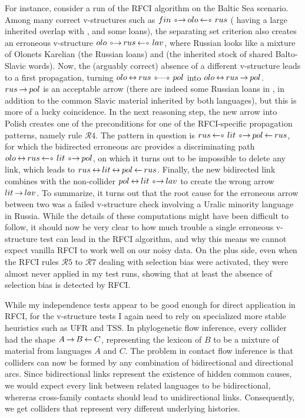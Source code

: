 For instance, consider a run of the RFCI algorithm on the Baltic Sea scenario. Among many correct v-structures such as $fin \arrowOA olo \arrowAO rus$ ( having a large inherited overlap with , and some  loans), the separating set criterion also creates an erroneous v-structure $olo \arrowOA rus \arrowAO lav$, where Russian looks like a mixture of Olonets Karelian (the Russian loans) and  (the inherited stock of shared Balto-Slavic words). Now, the (arguably correct) absence of a different v-structure leads to a first propagation, turning $olo \arrowAA rus \arrowOO pol$ into $olo \arrowAA rus \arrowLA pol$. $rus \arrowLA pol$ is an acceptable arrow (there are indeed some Russian loans in , in addition to the common Slavic material inherited by both languages), but this is more of a lucky coincidence. In the next reasoning step, the new arrow into Polish creates one of the preconditions for one of the RFCI-specific propagation patterns, 
namely rule $\mathcal{R}4$. The pattern in question is $rus \arrowAO lit \arrowOA pol \arrowAL rus$, for which the bidirected erroneous arc provides a discriminating path $olo \arrowAA rus \arrowAO lit \arrowOA pol$, on which it turns out to be impossible to delete any link, which leads to $rus \arrowAA lit \arrowAA pol \arrowAL rus$. Finally, the new bidirected link combines with the non-collider $pol \arrowAA lit \arrowOA lav$ to create the wrong arrow $lit \arrowLA lav$. To summarize, it turns out that the root cause for the erroneous arrow between two  was a failed v-structure check involving a Uralic minority language in Russia. While the details of these computations might have been difficult to follow, it should now be very clear to how much trouble a single erroneous v-structure test can lead in the RFCI algorithm, and why this means we cannot expect vanilla RFCI to work well on our noisy data. On the plus side, even when the RFCI rules $\mathcal{R}5$ to $\mathcal{R}7$ dealing 
with selection bias were activated, they were almost never applied in my test runs, showing that at least the absence of selection bias is detected by RFCI.

While my independence tests appear to be good enough for direct application in RFCI, for the v-structure tests I again need to rely on specialized more stable heuristics such as UFR and TSS. In phylogenetic flow inference, every collider had the shape $A \arrowLA B \arrowAL C$, representing the lexicon of $B$ to be a mixture of material from languages $A$ and $C$. The problem in contact flow inference is that colliders can now be formed by any combination of bidirectional and directional arcs. Since bidirectional links represent the existence of hidden common causes, we would expect every link between related languages to be bidirectional, whereras cross-family contacts should lead to unidirectional links. Consequently, we get colliders that represent very different underlying histories.

